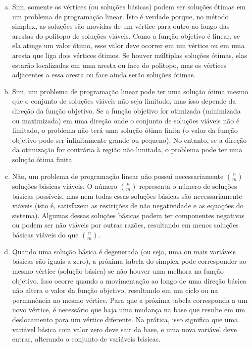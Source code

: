 \documentclass{article}
\begin{document}
\begin{enumerate}[(a)]
    \item Sim, somente os vértices (ou soluções básicas) podem ser soluções ótimas em um problema de programação linear. Isto é verdade porque, no método simplex, as soluções são movidas de um vértice para outro ao longo das arestas do politopo de soluções viáveis. Como a função objetivo é linear, se ela atinge um valor ótimo, esse valor deve ocorrer em um vértice ou em uma aresta que liga dois vértices ótimos. Se houver múltiplas soluções ótimas, elas estarão localizadas em uma aresta ou face do politopo, mas os vértices adjacentes a essa aresta ou face ainda serão soluções ótimas.
    \item Sim, um problema de programação linear pode ter uma solução ótima mesmo que o conjunto de soluções viáveis não seja limitado, mas isso depende da direção da função objetivo. Se a função objetivo for otimizada (minimizada ou maximizada) em uma direção onde o conjunto de soluções viáveis não é limitado, o problema não terá uma solução ótima finita (o valor da função objetivo pode ser infinitamente grande ou pequeno). No entanto, se a direção da otimização for contrária à região não limitada, o problema pode ter uma solução ótima finita.
    \item Não, um problema de programação linear não possui necessariamente $\binom{n}{m}$ soluções básicas viáveis. O número $\binom{n}{m}$ representa o número de soluções básicas possíveis, mas nem todas essas soluções básicas são necessariamente viáveis (isto é, satisfazem as restrições de não negatividade e as equações do sistema). Algumas dessas soluções básicas podem ter componentes negativas ou podem ser não viáveis por outras razões, resultando em menos soluções básicas viáveis do que $\binom{n}{m}$.
    \item Quando uma solução básica é degenerada (ou seja, uma ou mais variáveis básicas são iguais a zero), a próxima tabela do simplex pode corresponder ao mesmo vértice (solução básica) se não houver uma melhora na função objetivo. Isso ocorre quando a movimentação ao longo de uma direção básica não altera o valor da função objetivo, resultando em um ciclo ou na permanência no mesmo vértice. Para que a próxima tabela corresponda a um novo vértice, é necessário que haja uma mudança na base que resulte em um deslocamento para um vértice diferente. Na prática, isso significa que uma variável básica com valor zero deve sair da base, e uma nova variável deve entrar, alterando o conjunto de variáveis básicas.
\end{enumerate}
\end{document}
